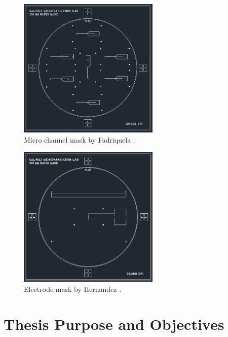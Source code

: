 \begin{figure}[h]
    \centering
    \includegraphics[width=0.6\textwidth]{images/micro_channel_mask.png}
    \caption{Micro channel mask by Fadriquela \cite{fadriquela_design_2009-1}.}
    \label{fig:microchannel_mask}
\end{figure}


\begin{figure}[h]
    \centering
    \includegraphics[width=0.6\textwidth]{images/electrode_mask.png}
    \caption{Electrode mask by Hernandez \cite{hernandez_single_2009-1}.}
    \label{fig:electrode_mask}
\end{figure}

\section[Objectives]{Thesis Purpose and Objectives}

